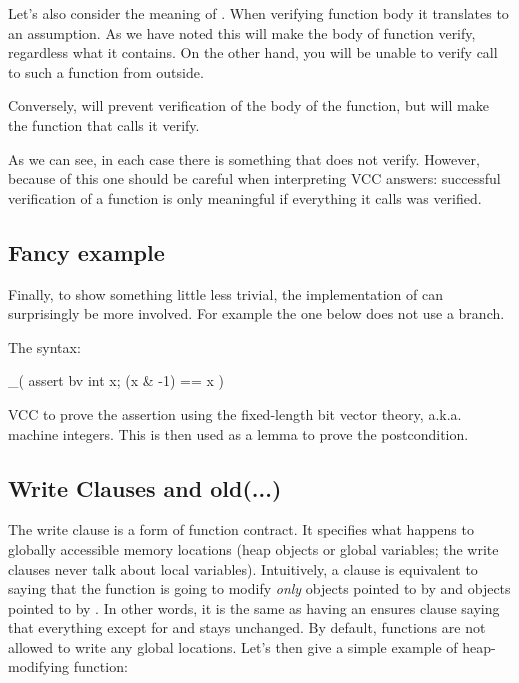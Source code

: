 Let's also consider the meaning of .
When verifying function body it translates to an assumption.
As we have noted this will make the body of function verify,
regardless what it contains.
On the other hand, you will be unable to verify call to such a function
from outside.

Conversely,  will prevent verification
of the body of the function, but will make the function that calls
it verify.

As we can see, in each case there is something that does not verify.
However, because of this one should be careful when interpreting
VCC answers: successful verification of a function is only meaningful
if everything it calls was verified.

\subsection{Fancy example}

Finally, 
to show something little less trivial, the implementation of  can surprisingly be more involved.
For example the one below does not use a branch.


\noindent
The syntax:
\begin{VCC}
_( assert {bv} \forall int x; (x & -1) == x )
\end{VCC}

\noindent
VCC to prove the assertion using the fixed-length bit vector theory, a.k.a. machine integers.
This is then used as a lemma to prove the postcondition.


\subsection{Write Clauses and old(...)}

The write clause is a form of function contract.
It specifies what happens to globally accessible memory locations
(\ie heap objects or global variables; the write clauses never talk
about local variables).
Intuitively, a clause  is equivalent to saying
that the function is going to modify \emph{only} objects pointed to by 
and objects pointed to by .
In other words, it is the same as having an ensures clause
saying that everything except for  and  stays unchanged.
By default, functions are not allowed to write any global locations.
Let's then give a simple example of heap-modifying function:

